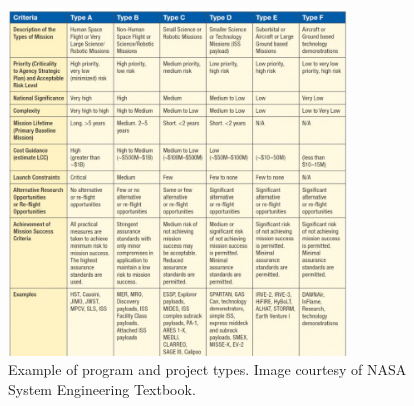 \begin{figure}[H] %
    \centering
    \includegraphics[width=0.8\textwidth]{figures/3.2.jpg}
    \caption{Example of program and project types. Image courtesy of NASA System Engineering Textbook.}
    \label{fig:communication2}
\end{figure}
